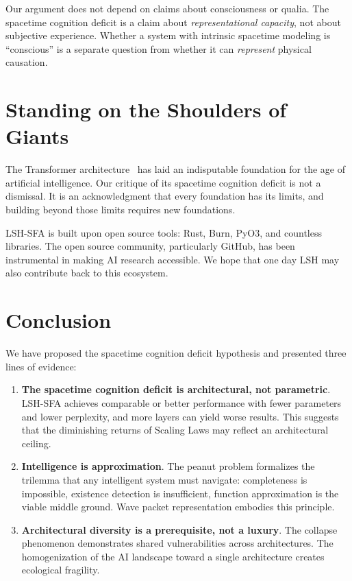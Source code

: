 \documentclass{article}
\begin{document}
Our argument does not depend on claims about consciousness or qualia. The spacetime cognition deficit is a claim about \textit{representational capacity}, not about subjective experience. Whether a system with intrinsic spacetime modeling is ``conscious'' is a separate question from whether it can \textit{represent} physical causation.

\section{Standing on the Shoulders of Giants}

The Transformer architecture~\citep{vaswani2017attention} has laid an indisputable foundation for the age of artificial intelligence. Our critique of its spacetime cognition deficit is not a dismissal. It is an acknowledgment that every foundation has its limits, and building beyond those limits requires new foundations.

LSH-SFA is built upon open source tools: Rust, Burn, PyO3, and countless libraries. The open source community, particularly GitHub, has been instrumental in making AI research accessible. We hope that one day LSH may also contribute back to this ecosystem.

\section{Conclusion}

We have proposed the spacetime cognition deficit hypothesis and presented three lines of evidence:

\begin{enumerate}
\item \textbf{The spacetime cognition deficit is architectural, not parametric}. LSH-SFA achieves comparable or better performance with fewer parameters and lower perplexity, and more layers can yield worse results. This suggests that the diminishing returns of Scaling Laws may reflect an architectural ceiling.

\item \textbf{Intelligence is approximation}. The peanut problem formalizes the trilemma that any intelligent system must navigate: completeness is impossible, existence detection is insufficient, function approximation is the viable middle ground. Wave packet representation embodies this principle.

\item \textbf{Architectural diversity is a prerequisite, not a luxury}. The collapse phenomenon demonstrates shared vulnerabilities across architectures. The homogenization of the AI landscape toward a single architecture creates ecological fragility.
\end{enumerate}
\end{document}
